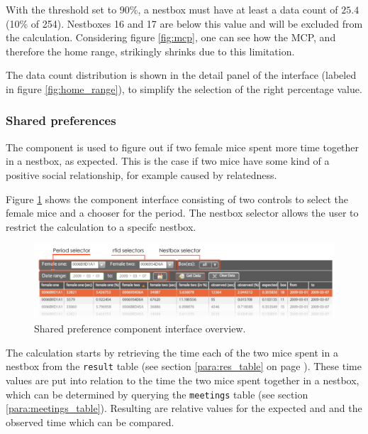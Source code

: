 With the threshold set to 90\%, a nestbox must have at least a data count of $25.4$ (10\% of 254). Nestboxes 16 and 17 are below this value and will be excluded from the calculation. Considering figure \ref{fig:mcp}, one can see how the MCP, and therefore the home range, strikingly shrinks due to this limitation. 

The data count distribution is shown in the detail panel of the interface (labeled in figure \ref{fig:home_range}), to simplify the selection of the right percentage value.     

\subsubsection{Shared preferences}
\label{subsubsec:sharedpref}

The component is used to figure out if two female mice spent more time together in a nestbox, as expected. This is the case if two mice have some kind of a positive social relationship, for example caused by relatedness.

Figure \ref{fig:shared_pref} shows the component interface consisting of two controls to select the female mice and a chooser for the period. The nestbox selector allows the user to restrict the calculation to a specifc nestbox.

\begin{figure}[htpb]
\begin{center}
  \includegraphics[width=\textwidth]{assets/pdf/shared_pref.pdf}
  \caption[Shared preference component interface]{Shared preference component interface overview.}
  \label{fig:shared_pref}
\end{center}
\end{figure}

The calculation starts by retrieving the time each of the two mice spent in a nestbox from the \lstinline|result| table (see section \ref{para:res_table} on page \pageref{para:res_table}). These time values are put into relation to the time the two mice spent together in a nestbox, which can be determined by querying the \lstinline|meetings| table (see section \ref{para:meetings_table}). Resulting are relative values for the expected and and the observed time which can be compared. 

